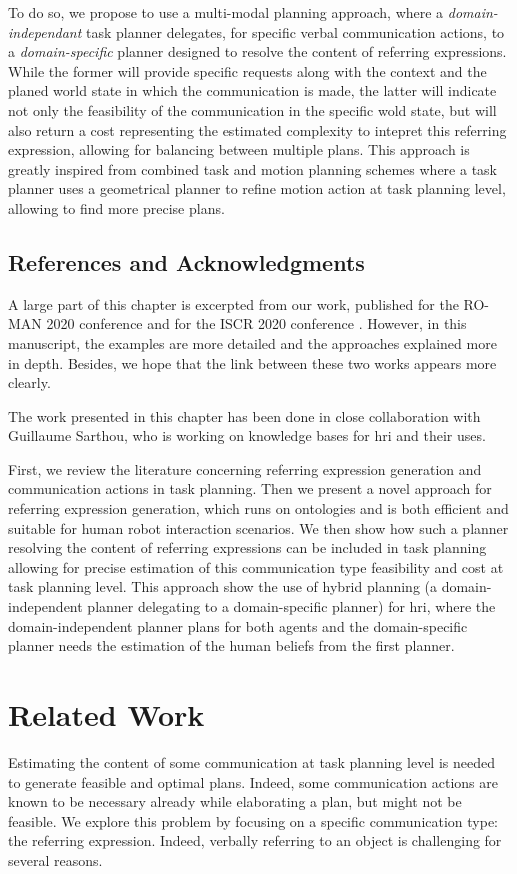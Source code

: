 \documentclass[a4paper,11pt,twoside]{StyleThese}
\begin{document}
To do so, we propose to use a multi-modal planning approach, where a \textit{domain-independant} task planner delegates, for specific verbal communication actions, to a \textit{domain-specific} planner designed to resolve the content of referring expressions. While the former will provide specific requests along with the context and the planed world state in which the communication is made, the latter will indicate not only the feasibility of the communication in the specific wold state, but will also return a cost representing the estimated complexity to intepret this referring expression, allowing for balancing between multiple plans. This approach is greatly inspired from combined task and motion planning schemes \cite{gharbi2015combining} where a task planner uses a geometrical planner to refine motion action at task planning level, allowing to find more precise plans.

\subsection{References and Acknowledgments}
A large part of this chapter is excerpted from our work, published for the RO-MAN 2020 conference \cite{buisan2020efficient} and for the ISCR 2020 conference \cite{buisan2020human}. However, in this manuscript, the examples are more detailed and the approaches explained more in depth. Besides, we hope that the link between these two works appears more clearly.

The work presented in this chapter has been done in close collaboration with Guillaume Sarthou, who is working on knowledge bases for \acrshort{hri} and their uses.

First, we review the literature concerning referring expression generation and communication actions in task planning. Then we present a novel approach for referring expression generation, which runs on ontologies and is both efficient and suitable for human robot interaction scenarios. We then show how such a planner resolving the content of referring expressions can be included in task planning allowing for precise estimation of this communication type feasibility and cost at task planning level. This approach show the use of hybrid planning (a domain-independent planner delegating to a domain-specific planner) for \acrshort{hri}, where the domain-independent planner plans for both agents and the domain-specific planner needs the estimation of the human beliefs from the first planner.

\section{Related Work}
Estimating the content of some communication at task planning level is needed to generate feasible and optimal plans. Indeed, some communication actions are known to be necessary already while elaborating a plan, but might not be feasible. We explore this problem by focusing on a specific communication type: the referring expression. Indeed, verbally referring to an object is challenging for several reasons. 
\end{document}
